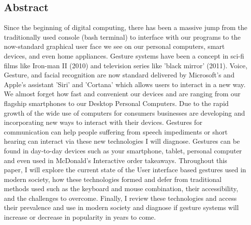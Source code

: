 


\subsection{Abstract}

Since the beginning of digital computing, there has been a massive jump from the traditionally used console (bash terminal) to interface with our programs to the now-standard graphical user face we see on our personal computers, smart devices, and even home appliances. Gesture systems have been a concept in sci-fi films like Iron-man II (2010) and television series like ’black mirror’ (2011). Voice, Gesture, and facial recognition are now standard delivered by Microsoft’s and Apple's assistant ’Siri’ and ’Cortana’ which allows users to interact in a new way. We almost forget how fast and convenient our devices and are ranging from our flagship smartphones to our Desktop Personal Computers. Due to the rapid growth of the wide use of computers for consumers businesses are developing and incorporating new ways to interact with their devices. Gestures for communication can help people suffering from speech impediments or short hearing can interact via these new technologies I will diagnose. Gestures can be found in day-to-day devices such as your smartphone, tablet, personal computer and even used in McDonald’s Interactive order takeaways. Throughout this paper, I will explore the current state of the User interface based gestures used in modern society, how these technologies formed and defer from traditional methods used such as the keyboard and mouse combination, their accessibility, and the challenges to overcome. Finally, I review these technologies and access their prevalence and use in modern society and diagnose if gesture systems will increase or decrease in popularity in years to come. 


